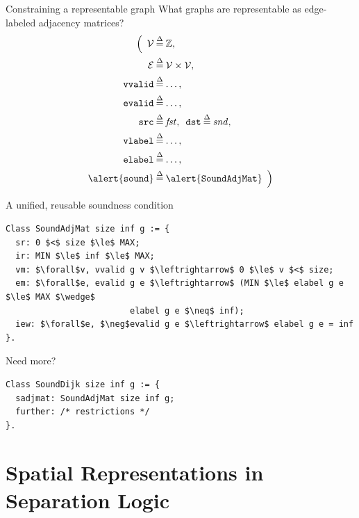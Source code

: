 \documentclass[usenames, xcolor=dvipsnames]{beamer}
\newcommand{\defeq}{\mathbin{\stackrel{\Delta}{=}}}
\newcommand{\m}[1]{\ensuremath{\mathit{#1}}} %
\begin{document}
\begin{frame}{Constraining a representable graph}
What graphs are representable as edge-labeled adjacency matrices? \\
\pause \bigskip
\vspace{-2em}
\begin{align*}
\Big(\hspace{0.5em}\mathcal{V}&\defeq\mathbb{Z}, \\
\mathcal{E}&\defeq\mathcal{V} \times \mathcal{V}, \\
\texttt{vvalid}&\defeq\ldots, \\ 
\texttt{evalid}&\defeq\ldots, \\
\texttt{src}&\defeq\m{fst}, \hspace{0.5em}\texttt{dst}\defeq\m{snd}, \\
\texttt{vlabel}&\defeq\ldots, \\
\texttt{elabel}&\defeq\ldots, \\
\alert{\texttt{sound}}&\defeq\alert{\texttt{SoundAdjMat}}\hspace{0.5em}\Big) 
\end{align*}

\end{frame}

\begin{frame}[fragile]{A unified, reusable soundness condition}

\begin{lstlisting}
Class SoundAdjMat size inf g := {
  sr: 0 $<$ size $\le$ MAX;
  ir: MIN $\le$ inf $\le$ MAX; 
  vm: $\forall$v, vvalid g v $\leftrightarrow$ 0 $\le$ v $<$ size;
  em: $\forall$e, evalid g e $\leftrightarrow$ (MIN $\le$ elabel g e $\le$ MAX $\wedge$ 
                         elabel g e $\neq$ inf);
  iew: $\forall$e, $\neg$evalid g e $\leftrightarrow$ elabel g e = inf
}.
\end{lstlisting}

\pause \bigskip

Need more?
\begin{lstlisting}
Class SoundDijk size inf g := {
  sadjmat: SoundAdjMat size inf g;
  further: /* restrictions */
}.
\end{lstlisting}

\end{frame}


\section{Spatial Representations in Separation Logic}
\end{document}
